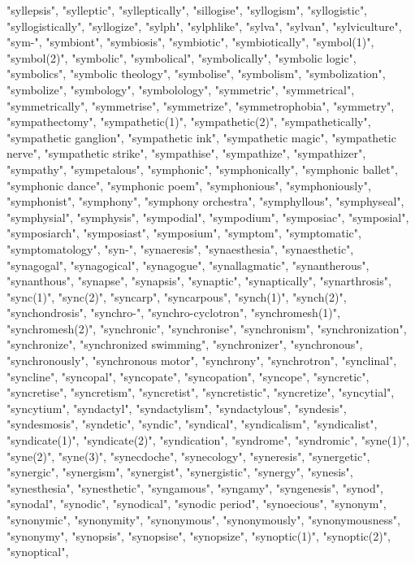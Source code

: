 "syllepsis",
"sylleptic",
"sylleptically",
"sillogise",
"syllogism",
"syllogistic",
"syllogistically",
"syllogize",
"sylph",
"sylphlike",
"sylva",
"sylvan",
"sylviculture",
"sym-",
"symbiont",
"symbiosis",
"symbiotic",
"symbiotically",
"symbol(1)",
"symbol(2)",
"symbolic",
"symbolical",
"symbolically",
"symbolic logic",
"symbolics",
"symbolic theology",
"symbolise",
"symbolism",
"symbolization",
"symbolize",
"symbology",
"symbolology",
"symmetric",
"symmetrical",
"symmetrically",
"symmetrise",
"symmetrize",
"symmetrophobia",
"symmetry",
"sympathectomy",
"sympathetic(1)",
"sympathetic(2)",
"sympathetically",
"sympathetic ganglion",
"sympathetic ink",
"sympathetic magic",
"sympathetic nerve",
"sympathetic strike",
"sympathise",
"sympathize",
"sympathizer",
"sympathy",
"sympetalous",
"symphonic",
"symphonically",
"symphonic ballet",
"symphonic dance",
"symphonic poem",
"symphonious",
"symphoniously",
"symphonist",
"symphony",
"symphony orchestra",
"symphyllous",
"symphyseal",
"symphysial",
"symphysis",
"sympodial",
"sympodium",
"symposiac",
"symposial",
"symposiarch",
"symposiast",
"symposium",
"symptom",
"symptomatic",
"symptomatology",
"syn-",
"synaeresis",
"synaesthesia",
"synaesthetic",
"synagogal",
"synagogical",
"synagogue",
"synallagmatic",
"synantherous",
"synanthous",
"synapse",
"synapsis",
"synaptic",
"synaptically",
"synarthrosis",
"sync(1)",
"sync(2)",
"syncarp",
"syncarpous",
"synch(1)",
"synch(2)",
"synchondrosis",
"synchro-",
"synchro-cyclotron",
"synchromesh(1)",
"synchromesh(2)",
"synchronic",
"synchronise",
"synchronism",
"synchronization",
"synchronize",
"synchronized swimming",
"synchronizer",
"synchronous",
"synchronously",
"synchronous motor",
"synchrony",
"synchrotron",
"synclinal",
"syncline",
"syncopal",
"syncopate",
"syncopation",
"syncope",
"syncretic",
"syncretise",
"syncretism",
"syncretist",
"syncretistic",
"syncretize",
"syncytial",
"syncytium",
"syndactyl",
"syndactylism",
"syndactylous",
"syndesis",
"syndesmosis",
"syndetic",
"syndic",
"syndical",
"syndicalism",
"syndicalist",
"syndicate(1)",
"syndicate(2)",
"syndication",
"syndrome",
"syndromic",
"syne(1)",
"syne(2)",
"syne(3)",
"synecdoche",
"synecology",
"syneresis",
"synergetic",
"synergic",
"synergism",
"synergist",
"synergistic",
"synergy",
"synesis",
"synesthesia",
"synesthetic",
"syngamous",
"syngamy",
"syngenesis",
"synod",
"synodal",
"synodic",
"synodical",
"synodic period",
"synoecious",
"synonym",
"synonymic",
"synonymity",
"synonymous",
"synonymously",
"synonymousness",
"synonymy",
"synopsis",
"synopsise",
"synopsize",
"synoptic(1)",
"synoptic(2)",
"synoptical",
